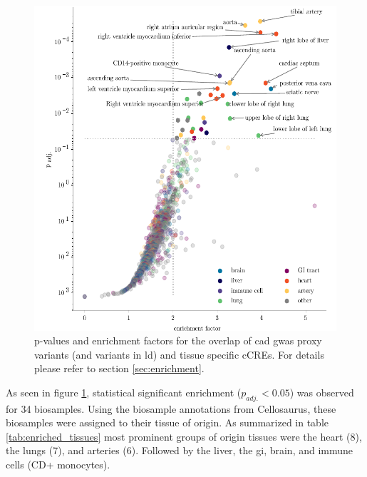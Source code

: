 \begin{figure}[h!]
\capstart
    \centering
	\includegraphics{Abbildung/enrichment_scatter.pdf}

	\begin{minipage}{\captionwidth}
		\caption[enrichemtn]{ \newline p-values and enrichment factors for the overlap of \ac{cad} \ac{gwas} proxy variants (and variants in \ac{ld}) and tissue specific \acp{cCRE}. For details please refer to section \ref{sec:enrichment}.}
		\label{fig:enrichment}
	\end{minipage}
\end{figure}

As seen in figure \ref{fig:enrichment}, statistical significant enrichment ($p_{adj.}<0.05$) was observed for 34 biosamples. Using the biosample annotations from Cellosaurus, these biosamples were assigned to their tissue of origin. As summarized in table \ref{tab:enriched_tissues} most prominent groups of origin tissues were the heart (8), the lungs (7), and arteries (6). Followed by the liver, the \ac{gi}, brain, and immune cells (CD+ monocytes).


